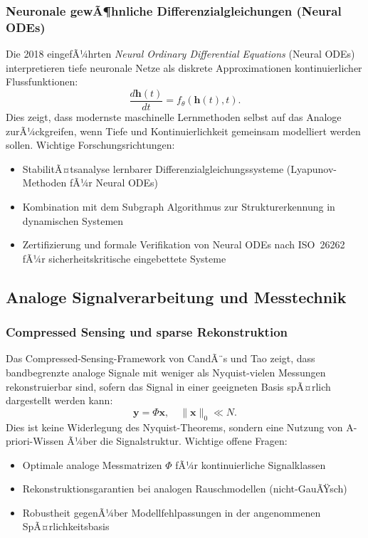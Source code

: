 ﻿\documentclass[a4paper,12pt]{article}
\theoremstyle{definition}
\begin{document}
\subsubsection{Neuronale gewÃ¶hnliche Differenzialgleichungen (Neural ODEs)}

Die 2018 eingefÃ¼hrten \emph{Neural Ordinary Differential Equations} (Neural ODEs)
\citep{Chen2018} interpretieren tiefe neuronale Netze als diskrete Approximationen
kontinuierlicher Flussfunktionen:
\[
\frac{d\mathbf{h}(t)}{dt} = f_\theta(\mathbf{h}(t), t).
\]
Dies zeigt, dass modernste maschinelle Lernmethoden selbst auf das Analoge
zurÃ¼ckgreifen, wenn Tiefe und Kontinuierlichkeit gemeinsam modelliert werden sollen.
Wichtige Forschungsrichtungen:
\begin{itemize}
    \item StabilitÃ¤tsanalyse lernbarer Differenzialgleichungssysteme
          (Lyapunov-Methoden fÃ¼r Neural ODEs)
    \item Kombination mit dem Subgraph Algorithmus zur Strukturerkennung
          in dynamischen Systemen \citep{Epp2026embedded}
    \item Zertifizierung und formale Verifikation von Neural ODEs nach
          ISO~26262 fÃ¼r sicherheitskritische eingebettete Systeme
\end{itemize}

\subsection{Analoge Signalverarbeitung und Messtechnik}

\subsubsection{Compressed Sensing und sparse Rekonstruktion}

Das Compressed-Sensing-Framework von CandÃ¨s und Tao \citep{Candes2006}
zeigt, dass bandbegrenzte analoge Signale mit weniger als
Nyquist-vielen Messungen rekonstruierbar sind, sofern das Signal in einer
geeigneten Basis spÃ¤rlich dargestellt werden kann:
\[
\mathbf{y} = \Phi \mathbf{x}, \quad \|\mathbf{x}\|_0 \ll N.
\]
Dies ist keine Widerlegung des Nyquist-Theorems, sondern eine Nutzung von
A-priori-Wissen Ã¼ber die Signalstruktur.  Wichtige offene Fragen:
\begin{itemize}
    \item Optimale analoge Messmatrizen $\Phi$ fÃ¼r kontinuierliche Signalklassen
    \item Rekonstruktionsgarantien bei analogen Rauschmodellen (nicht-GauÃŸsch)
    \item Robustheit gegenÃ¼ber Modellfehlpassungen in der angenommenen SpÃ¤rlichkeitsbasis
\end{itemize}
\end{document}
